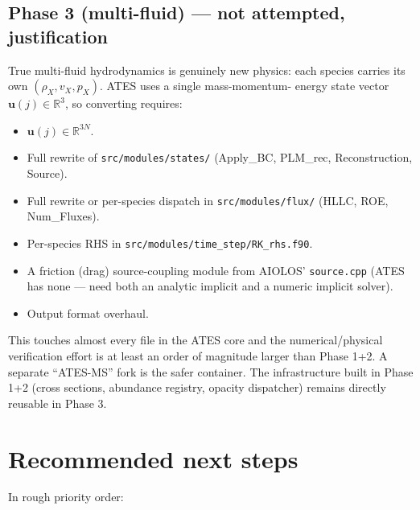 \documentclass[english,a4paper]{kiseon_memo}
\begin{document}
\subsection{Phase 3 (multi-fluid) --- not attempted, justification}

True multi-fluid hydrodynamics is genuinely new physics: each species
carries its own $(\rho_X, v_X, p_X)$. ATES uses a single mass-momentum-
energy state vector $\mathbf{u}(j) \in \mathbb{R}^3$, so converting requires:
\begin{itemize}
\item $\mathbf{u}(j) \in \mathbb{R}^{3N}$.
\item Full rewrite of \texttt{src/modules/states/} (Apply\_BC, PLM\_rec,
Reconstruction, Source).
\item Full rewrite or per-species dispatch in \texttt{src/modules/flux/}
(HLLC, ROE, Num\_Fluxes).
\item Per-species RHS in \texttt{src/modules/time\_step/RK\_rhs.f90}.
\item A friction (drag) source-coupling module from
AIOLOS' \texttt{source.cpp} (ATES has none --- need both an analytic
implicit and a numeric implicit solver).
\item Output format overhaul.
\end{itemize}

This touches almost every file in the ATES core and the numerical/physical
verification effort is at least an order of magnitude larger than Phase 1+2.
A separate ``ATES-MS'' fork is the safer container. The infrastructure
built in Phase 1+2 (cross sections, abundance registry, opacity dispatcher)
remains directly reusable in Phase 3.

\section{Recommended next steps}

In rough priority order:
\end{document}
